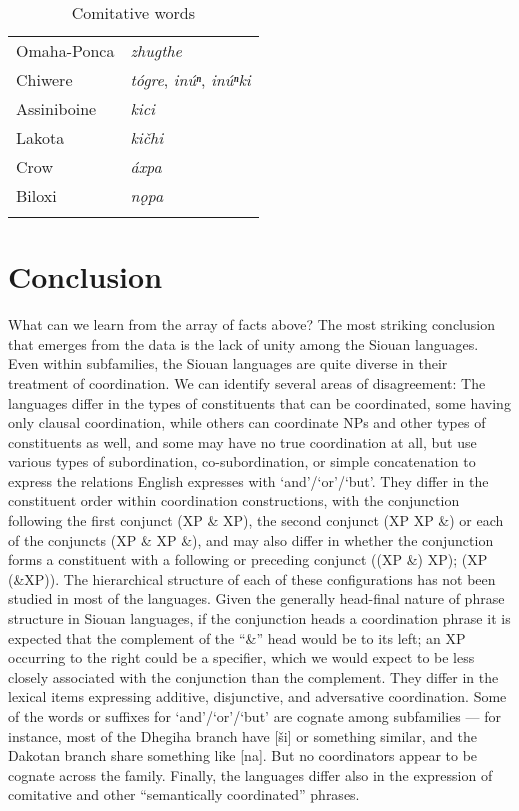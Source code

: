 \documentclass[output=paper]{LSP/langsci}
\begin{document}
\begin{table}
\caption{Comitative words} \label{comitative} 

\begin{tabular} [t]{ l  l  }
\lsptoprule
Omaha-Ponca	& \textit{zhugthe} \\
Chiwere &  \textit{t\'ogre},  \textit{in\'uⁿ}, \textit{in\'uⁿki} \\
Assiniboine &  \textit{kici} \\
Lakota & \textit{ki\v{c}hi} \\
Crow & \textit{\'axpa} \\
Biloxi & \textit{n\k{o}pa} \\
\lspbottomrule
\end{tabular}
\end{table}

\section{Conclusion}
 
What can we learn from the array of facts above? The most striking conclusion that emerges from the data is the lack of unity among the Siouan languages. Even within subfamilies, the Siouan languages are quite diverse in their treatment of coordination. We can identify several areas of disagreement:  The languages differ in the types of constituents that can be coordinated, some having only clausal coordination, while others can coordinate NPs and other types of constituents as well, and some may have no true
coordination at all, but use various types of subordination, co-subordination, or simple concatenation to express the relations English expresses with `and'/`or'/`but'.  They differ in the constituent order within coordination constructions, with the conjunction following the first conjunct (XP \& XP), the second conjunct (XP XP \&) or each of the conjuncts (XP \& XP \&), and may also differ in whether the conjunction forms a constituent with a following or preceding conjunct ((XP \&) XP); (XP (\&XP)). The hierarchical structure of each of these configurations has not been studied in most of the languages. Given the generally head-final nature of phrase structure in Siouan languages, if the conjunction heads a coordination phrase it is expected that the complement of the ``\&'' head would be to its left; an XP occurring to the right could be a specifier, which we would expect to be less closely associated with the conjunction than the complement.  They differ in the lexical items expressing additive, disjunctive, and adversative coordination. Some of the words or suffixes for `and'/`or'/`but' are cognate among subfamilies --- for instance, most of the Dhegiha branch have [\v{s}i] or something similar, and the Dakotan branch share something like [na]. But no coordinators appear to be cognate across the family.  Finally, the languages differ also in the expression of comitative and other ``semantically coordinated'' phrases.
\end{document}
